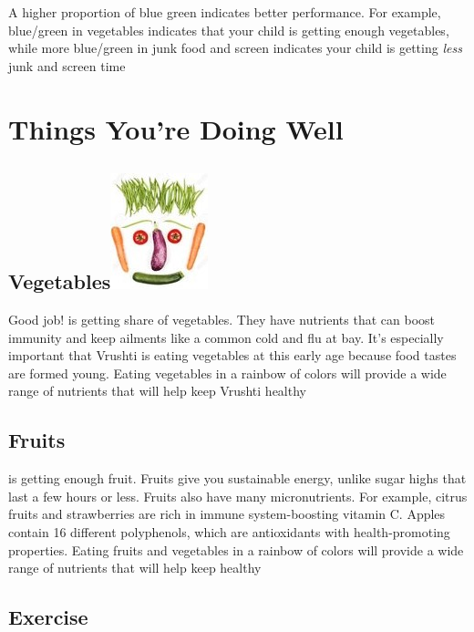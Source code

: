 \documentclass[]{article}
\begin{document}
A higher proportion of blue green indicates better performance. For
example, blue/green in vegetables indicates that your child is getting
enough vegetables, while more blue/green in junk food and screen
indicates your child is getting \emph{less} junk and screen time

\newpage

\section{Things You're Doing Well}\label{things-youre-doing-well}

\subsection[Vegetables]{\texorpdfstring{Vegetables\protect\includegraphics{../Files/vegetable.jpg}}{Vegetables}}\label{vegetables}

Good job! is getting share of vegetables. They have nutrients that can
boost immunity and keep ailments like a common cold and flu at bay. It's
especially important that Vrushti is eating vegetables at this early age
because food tastes are formed young. Eating vegetables in a rainbow of
colors will provide a wide range of nutrients that will help keep
Vrushti healthy

\subsection{\texorpdfstring{Fruits\emph{}}{Fruits}}\label{fruits}

is getting enough fruit. Fruits give you sustainable energy, unlike
sugar highs that last a few hours or less. Fruits also have many
micronutrients. For example, citrus fruits and strawberries are rich in
immune system-boosting vitamin C. Apples contain 16 different
polyphenols, which are antioxidants with health-promoting properties.
Eating fruits and vegetables in a rainbow of colors will provide a wide
range of nutrients that will help keep healthy

\subsection{Exercise}\label{exercise}
\end{document}

